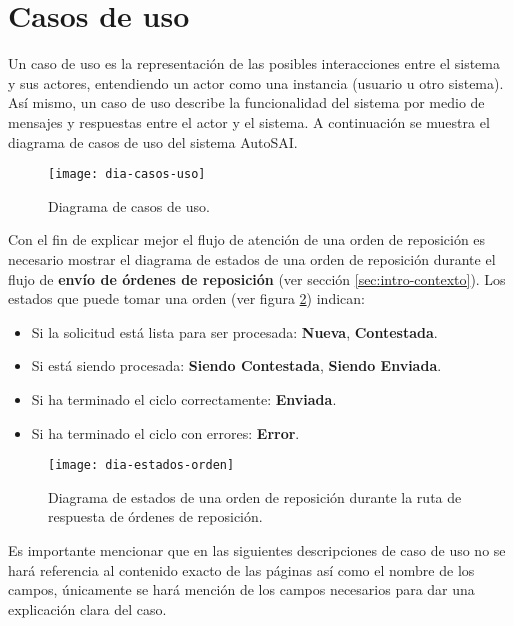 
\section{Casos de uso}
Un caso de uso es la representación de las posibles interacciones entre el sistema y sus actores, entendiendo un actor como una instancia (usuario u otro sistema). Así mismo, un caso de uso describe la funcionalidad del sistema por medio de mensajes y respuestas entre el actor y el sistema\cite{ApressSE}. A continuación se muestra el diagrama de casos de uso del sistema AutoSAI.

\begin{figure}[h]
\centering
\texttt{[image: dia-casos-uso]} 
\caption{Diagrama de casos de uso.}
\label{fig:dia-casos-uso}
\end{figure}

Con el fin de explicar mejor el flujo de atención de una orden de reposición es necesario mostrar el diagrama de estados de una orden de reposición durante el flujo de \textbf{envío de órdenes de reposición} (ver sección \ref{sec:intro-contexto}). Los estados que puede tomar una orden (ver figura \ref{fig:dia-estados-orden}) indican:
\begin{itemize}
  \item Si la solicitud está lista para ser procesada: \textbf{Nueva}, \textbf{Contestada}.
  \item Si está siendo procesada: \textbf{Siendo Contestada}, \textbf{Siendo Enviada}.
  \item Si ha terminado el ciclo correctamente: \textbf{Enviada}.
  \item Si ha terminado el ciclo con errores: \textbf{Error}.
\end{itemize} 

\begin{figure}[h]
\centering
\texttt{[image: dia-estados-orden]} 
\caption{Diagrama de estados de una orden de reposición durante la ruta de respuesta de órdenes de reposición.}
\label{fig:dia-estados-orden}
\end{figure}

Es importante mencionar que en las siguientes descripciones de caso de uso no se hará referencia al contenido exacto de las páginas así como el nombre de los campos, únicamente se hará mención de los campos necesarios para dar una explicación clara del caso.

